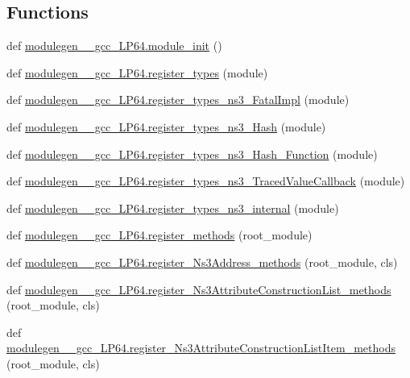 \subsection*{Functions}
\begin{DoxyCompactItemize}
\item 
def \hyperlink{namespacemodulegen____gcc__LP64_a6fa3bcd89827bb55aea467ffebc10531}{modulegen\+\_\+\+\_\+gcc\+\_\+\+L\+P64.\+module\+\_\+init} ()
\item 
def \hyperlink{namespacemodulegen____gcc__LP64_ab61bb54af74e931fcb41c8f8677a8eb5}{modulegen\+\_\+\+\_\+gcc\+\_\+\+L\+P64.\+register\+\_\+types} (module)
\item 
def \hyperlink{namespacemodulegen____gcc__LP64_a2262e0d4e35e243aa3a1da10a2cb4e41}{modulegen\+\_\+\+\_\+gcc\+\_\+\+L\+P64.\+register\+\_\+types\+\_\+ns3\+\_\+\+Fatal\+Impl} (module)
\item 
def \hyperlink{namespacemodulegen____gcc__LP64_a93555c52620e0de62d76d0946d4554a2}{modulegen\+\_\+\+\_\+gcc\+\_\+\+L\+P64.\+register\+\_\+types\+\_\+ns3\+\_\+\+Hash} (module)
\item 
def \hyperlink{namespacemodulegen____gcc__LP64_a3e77b4168f4d6176242961c3f3cd12f0}{modulegen\+\_\+\+\_\+gcc\+\_\+\+L\+P64.\+register\+\_\+types\+\_\+ns3\+\_\+\+Hash\+\_\+\+Function} (module)
\item 
def \hyperlink{namespacemodulegen____gcc__LP64_a932218c26ce11fb1473ffc3980f37614}{modulegen\+\_\+\+\_\+gcc\+\_\+\+L\+P64.\+register\+\_\+types\+\_\+ns3\+\_\+\+Traced\+Value\+Callback} (module)
\item 
def \hyperlink{namespacemodulegen____gcc__LP64_aa5591cd0831727624dde86d56333dc35}{modulegen\+\_\+\+\_\+gcc\+\_\+\+L\+P64.\+register\+\_\+types\+\_\+ns3\+\_\+internal} (module)
\item 
def \hyperlink{namespacemodulegen____gcc__LP64_a8ac8e0786047c1ed08fed9bc1a45843d}{modulegen\+\_\+\+\_\+gcc\+\_\+\+L\+P64.\+register\+\_\+methods} (root\+\_\+module)
\item 
def \hyperlink{namespacemodulegen____gcc__LP64_a0bc87667cfe5a45fc4aa7c0de2ae51d2}{modulegen\+\_\+\+\_\+gcc\+\_\+\+L\+P64.\+register\+\_\+\+Ns3\+Address\+\_\+methods} (root\+\_\+module, cls)
\item 
def \hyperlink{namespacemodulegen____gcc__LP64_a4dea76fc9218ba239313d01e5ac1d4cd}{modulegen\+\_\+\+\_\+gcc\+\_\+\+L\+P64.\+register\+\_\+\+Ns3\+Attribute\+Construction\+List\+\_\+methods} (root\+\_\+module, cls)
\item 
def \hyperlink{namespacemodulegen____gcc__LP64_a897162c4bcad09fae06079f3c1b24777}{modulegen\+\_\+\+\_\+gcc\+\_\+\+L\+P64.\+register\+\_\+\+Ns3\+Attribute\+Construction\+List\+Item\+\_\+methods} (root\+\_\+module, cls)

\end{DoxyCompactItemize}
